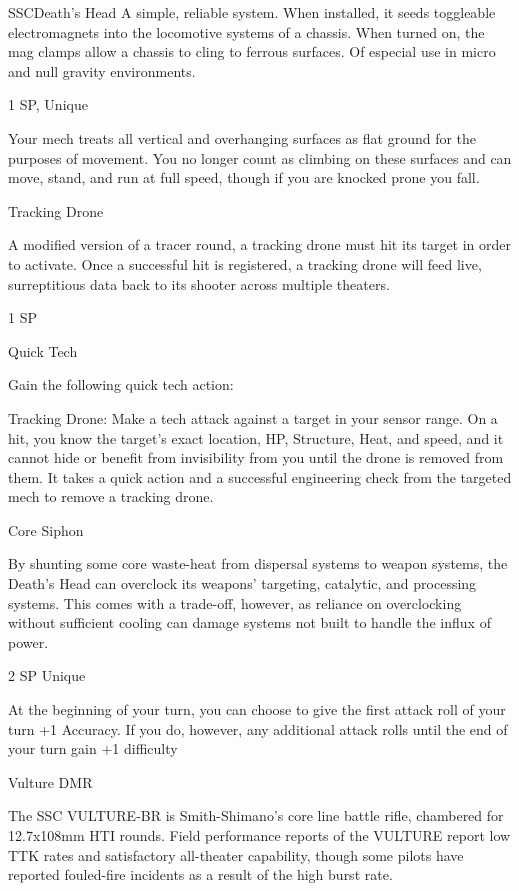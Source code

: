 \begin{mech}{SSC}{Death's Head}
A simple, reliable system. When installed, it seeds toggleable electromagnets into the locomotive systems of a chassis. When turned on, the mag clamps allow a chassis to cling to ferrous surfaces. Of especial use in micro and null gravity environments.

1 SP, Unique

Your mech treats all vertical and overhanging surfaces as flat ground for the purposes of movement. You no longer count as climbing on these surfaces and can move, stand, and run at full speed, though if you are knocked prone you fall.


Tracking Drone

A modified version of a tracer round, a tracking drone must hit its target in order to activate. Once a successful hit is registered, a tracking drone will feed live, surreptitious data back to its shooter across multiple theaters.

1 SP

Quick Tech

Gain the following quick tech action:

Tracking Drone: Make a tech attack against a target in your sensor range. On a hit, you know the target’s exact location, HP, Structure, Heat, and speed, and it cannot hide or benefit from invisibility from you until the drone is removed from them. It takes a quick action and a successful engineering check from the targeted mech to remove a tracking drone.


Core Siphon

By shunting some core waste-heat from dispersal systems to weapon systems, the Death’s Head can overclock its weapons’ targeting, catalytic, and processing systems. This comes with a trade-off, however, as reliance on overclocking without sufficient cooling can damage systems not built to handle the influx of power.

2 SP
Unique

At the beginning of your turn, you can choose to give the first attack roll of your turn +1 Accuracy. If you do, however, any additional attack rolls until the end of your turn gain +1 difficulty


Vulture DMR

The SSC VULTURE-BR is Smith-Shimano’s core line battle rifle, chambered for 12.7x108mm HTI rounds. Field performance reports of the VULTURE report low TTK rates and satisfactory all-theater capability, though some pilots have reported fouled-fire incidents as a result of the high burst rate.


\end{mech}
